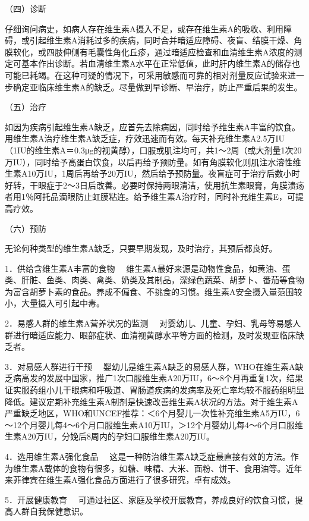 （四）诊断

仔细询问病史，如病人存在维生素A摄入不足，或存在维生素A的吸收、利用障碍，或引起维生素A消耗过多的疾病，同时合并暗适应障碍、夜盲、结膜干燥、角膜软化，或四肢伸侧有毛囊性角化丘疹，通过暗适应检查和血清维生素A浓度的测定可基本作出诊断。若血清维生素A水平在正常低值，此时肝内维生素A的储存也可能已耗竭。在这种可疑的情况下，可采用敏感而可靠的相对剂量反应试验来进一步确定亚临床维生素A的缺乏。尽量做到早诊断、早治疗，防止严重后果的发生。

（五）治疗

如因为疾病引起维生素A缺乏，应首先去除病因，同时给予维生素A丰富的饮食。用维生素A治疗维生素A缺乏症，疗效迅速而有效。每天补充维生素A2.5万IU（1IU的维生素A＝0.3μg的视黄醇），口服或肌注均可，共1～2周（或大剂量1次20万IU），同时给予高蛋白饮食，以后再给予预防量。如有角膜软化则肌注水溶性维生素A10万IU，1周后再给予20万IU，然后给予预防量。夜盲症可于治疗后数小时好转，干眼症于2～3日后改善。必要时保持两眼清洁，使用抗生素眼膏，角膜溃疡者用1％阿托品滴眼防止虹膜粘连。给予维生素A治疗时，同时补充维生素E，可提高疗效。

（六）预防

无论何种类型的维生素A缺乏，只要早期发现，及时治疗，其预后都良好。

{1．供给含维生素A丰富的食物}
　维生素A最好来源是动物性食品，如黄油、蛋类、肝脏、鱼类、肉类、禽类、奶类及其制品，深绿色蔬菜、胡萝卜、番茄等食物为富含胡萝卜素的食品。养成不偏食、不挑食的习惯。维生素A安全摄入量范围较小，大量摄入可引起中毒。

{2．易感人群的维生素A营养状况的监测}
　对婴幼儿、儿童、孕妇、乳母等易感人群进行暗适应能力、眼部症状、血清视黄醇水平等方面的检测，及时发现亚临床缺乏者。

{3．对易感人群进行干预}
　婴幼儿是维生素A缺乏的易感人群，WHO在维生素A缺乏病高发的发展中国家，推广1次口服维生素A20万IU，6～8个月再重复1次，结果证实服药组小儿干眼病和呼吸道、胃肠道疾病的发病率及死亡率均较不服药组明显降低。建议定期补充维生素A制剂是快速改善维生素A状况的方法。对于维生素A严重缺乏地区，WHO和UNCEF推荐：＜6个月婴儿一次性补充维生素A5万IU，6～12个月婴儿每4～6个月口服维生素A10万IU，＞12个月婴幼儿每4～6个月口服维生素A20万IU，分娩后8周内的孕妇口服维生素A20万IU。

{4．选用维生素A强化食品}
　这是一种防治维生素A缺乏症最直接有效的方法。作为维生素A载体的食物有很多，如糖、味精、大米、面粉、饼干、食用油等。近年来菲律宾在维生素A强化食品方面进行了很多研究，卓有成效。

{5．开展健康教育}
　可通过社区、家庭及学校开展教育，养成良好的饮食习惯，提高人群自我保健意识。

